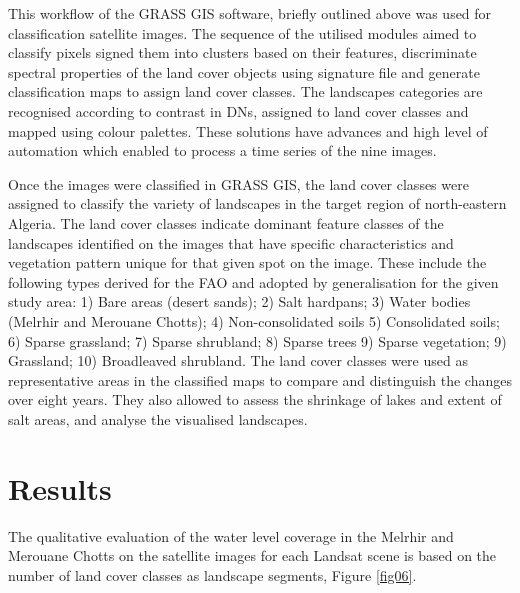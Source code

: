 \documentclass[asi,article,submit,pdftex,moreauthors]{Definitions/mdpi}
\begin{document}
This workflow of the GRASS GIS software, briefly outlined above was used for classification satellite images. The sequence of the utilised modules aimed to classify pixels signed them into clusters based on their features, discriminate spectral properties of the land cover objects using signature file and generate classification maps to assign land cover classes. The landscapes categories are recognised according to contrast in DNs, assigned to land cover classes and mapped using colour palettes. These solutions have advances and high level of automation which enabled to process a time series of the nine images. 

Once the images were classified in GRASS GIS, the land cover classes were assigned to classify the variety of landscapes in the target region of north-eastern Algeria. The land cover classes indicate dominant feature classes of the landscapes identified on the images that have specific characteristics and vegetation pattern unique for that given spot on the image. These include the following types derived for the FAO and adopted by generalisation for the given study area: 1) Bare areas (desert sands); 2) Salt hardpans; 3) Water bodies (Melrhir and Merouane Chotts); 4) Non-consolidated soils 5) Consolidated soils; 6) Sparse grassland; 7) Sparse shrubland; 8) Sparse trees 9) Sparse vegetation; 9) Grassland; 10) Broadleaved shrubland. The land cover classes were used as representative areas in the classified maps to compare and distinguish the changes over eight years. They also allowed to assess the shrinkage of lakes and extent of salt areas, and analyse the visualised landscapes. 

\section{Results}

The qualitative evaluation of the water level coverage in the Melrhir and Merouane Chotts on the satellite images for each Landsat scene is based on the number of land cover classes as landscape segments, Figure \ref{fig06}.
\end{document}

